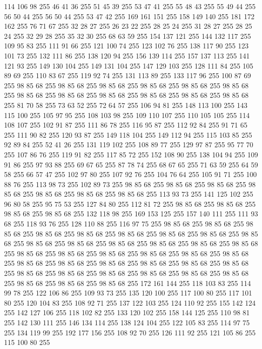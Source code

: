 114 106 98 255 46 41 36 255 51 45 39 255 53 47 41 255 55 48 43 255 55 49 44 255 56 50 44 255 56 50 44 255 53 47 42 255 169 161 151 255 158 149 140 255 181 172 162 255 76 71 67 255 32 28 27 255 26 23 22 255 28 25 24 255 31 28 27 255 28 25 24 255 32 29 28 255 35 32 30 255 68 63 59 255 154 137 121 255 144 132 117 255 109 95 83 255 111 91 66 255 121 100 74 255 123 102 76 255 138 117 90 255 123 101 73 255 132 111 86 255 138 120 94 255 156 139 114 255 157 137 113 255 141 121 93 255 149 130 104 255 149 131 104 255 147 129 103 255 128 111 84 255 105 89 69 255 110 83 67 255 119 92 74 255 131 113 89 255 133 117 96 255 100 87 69 255 98 85 68 255 98 85 68 255 98 85 68 255 98 85 68 255 98 85 68 255 98 85 68 255 98 85 68 255 98 85 68 255 98 85 68 255 98 85 68 255 98 85 68 255 98 85 68 255 81 70 58 255 73 63 52 255 72 64 57 255 106 94 81 255 148 113 100 255 143 115 100 255 105 97 95 255 108 103 98 255
109 110 107 255 110 105 105 255 114 108 107 255 102 91 87 255 111 86 78 255 116 95 87 255 112 92 84 255 91 71 65 255 111 90 82 255 120 93 87 255 149 118 104 255 149 112 94 255 115 103 85 255 92 89 84 255 52 41 26 255 131 119 102 255 108 89 77 255 129 97 87 255 95 77 70 255 107 86 76 255 119 91 82 255 117 85 72 255 152 108 90 255 138 104 94 255 109 91 86 255 97 93 88 255 69 67 65 255 87 78 74 255 68 67 65 255 71 63 59 255 64 59 58 255 66 57 47 255 102 97 80 255 107 92 76 255 104 76 64 255 105 91 71 255 100 88 76 255 113 98 73 255 102 89 73 255 98 85 68 255 98 85 68 255 98 85 68 255 98 85 68 255 98 85 68 255 98 85 68 255 98 85 68 255 113 93 73 255 141 125 102 255 96 80 58 255 95 75 53 255 127 84 80 255 112 81 72 255 98 85 68 255 98 85 68 255 98 85 68 255 98 85 68 255 132 118 98 255 169 153 125 255 157 140 111 255 111 93 68 255 118 93 76 255 128 110 88 255 116 97 75 255 98 85 68 255
98 85 68 255 98 85 68 255 98 85 68 255 98 85 68 255 98 85 68 255 98 85 68 255 98 85 68 255 98 85 68 255 98 85 68 255 98 85 68 255 98 85 68 255 98 85 68 255 98 85 68 255 98 85 68 255 98 85 68 255 98 85 68 255 98 85 68 255 98 85 68 255 98 85 68 255 98 85 68 255 98 85 68 255 98 85 68 255 98 85 68 255 98 85 68 255 98 85 68 255 98 85 68 255 98 85 68 255 98 85 68 255 98 85 68 255 98 85 68 255 98 85 68 255 98 85 68 255 98 85 68 255 98 85 68 255 98 85 68 255 172 161 144 255 118 103 83 255 114 99 78 255 122 106 86 255 109 93 73 255 135 120 100 255 117 100 80 255 117 101 80 255 120 104 83 255 108 92 71 255 137 122 103 255 124 110 92 255 155 142 124 255 142 127 106 255 118 102 82 255 133 120 102 255 158 144 125 255 110 98 81 255 142 130 111 255 146 134 114 255 138 124 104 255 122 105 83 255 114 97 75 255 134 119 99 255 192 177 156 255 108 92 70 255 126 111 92 255 121 105 86 255 115 100 80 255
